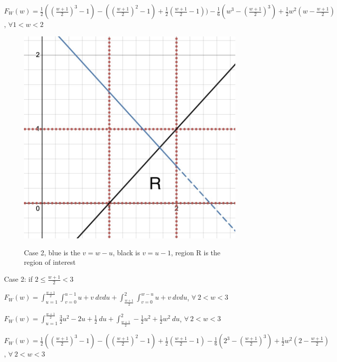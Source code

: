 \documentclass{article} %
\begin{document}
    $F_W(w)=\frac{1}{2}((\frac{w+1}{2})^3-1)-((\frac{w+1}{2})^2-1)+\frac{1}{2}(\frac{w+1}{2}-1))-\frac{1}{6}(w^3-(\frac{w+1}{2})^3)+\frac{1}{2}w^2(w-\frac{w+1}{2})$, $\forall 1 < w <2$
\newpage
\begin{figure}[]
    \centering
    \includegraphics[scale=0.20]{HW/HW4/p1c_case2.jpg}
    \label{fig:$F_W,2$}
    \caption{Case 2, blue is the $v = w-u$, black is $v = u-1$, region R is the region of interest}    
\end{figure}

    Case 2: if $2 \leq \frac{w+1}{2} < 3$

    $F_W(w)=\int_{u=1}^{\frac{w+1}{2}}\int_{v=0}^{u-1}u+v \ dvdu + \int_{\frac{w+1}{2}}^{2}\int_{v=0}^{w-u}u+v \ dvdu$, $\forall \ 2<w<3$

    $F_W(w)=\int_{u=1}^{\frac{w+1}{2}}\frac{3}{2}u^2-2u+\frac{1}{2} \ du + \int_{\frac{w+1}{2}}^{2}-\frac{1}{2}u^2+\frac{1}{2}w^2 \ du$, $\forall \ 2<w<3$

    $F_W(w)=\frac{1}{2}((\frac{w+1}{2})^3-1)-((\frac{w+1}{2})^2-1)+\frac{1}{2}(\frac{w+1}{2}-1)-\frac{1}{6}(2^3-(\frac{w+1}{2})^3)+\frac{1}{2}w^2(2-\frac{w+1}{2})$, $\forall \ 2<w<3$ \\
\end{document}
